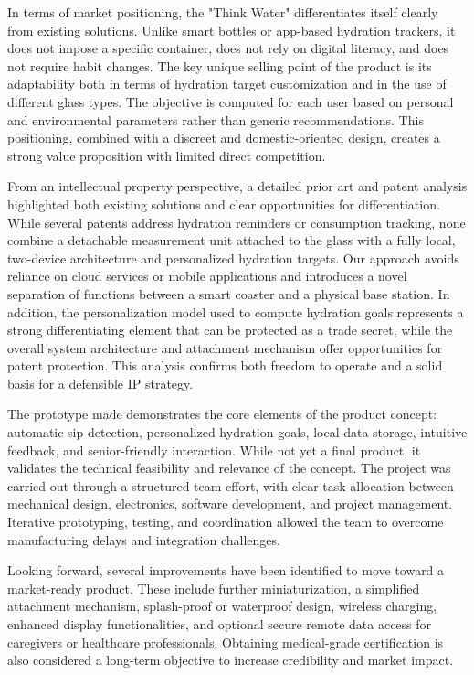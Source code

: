 \documentclass{article}
\begin{document}
In terms of market positioning, the "Think Water" differentiates itself clearly from existing solutions. Unlike smart bottles or app-based hydration trackers, it does not impose a specific container, does not rely on digital literacy, and does not require habit changes. The key unique selling point of the product is its adaptability both in terms of hydration target customization and in the use of different glass types. The objective is computed for each user based on personal and environmental parameters rather than generic recommendations. This positioning, combined with a discreet and domestic-oriented design, creates a strong value proposition with limited direct competition.\vspace{0.2cm}

From an intellectual property perspective, a detailed prior art and patent analysis highlighted both existing solutions and clear opportunities for differentiation. While several patents address hydration reminders or consumption tracking, none combine a detachable measurement unit attached to the glass with a fully local, two-device architecture and personalized hydration targets. Our approach avoids reliance on cloud services or mobile applications and introduces a novel separation of functions between a smart coaster and a physical base station. In addition, the personalization model used to compute hydration goals represents a strong differentiating element that can be protected as a trade secret, while the overall system architecture and attachment mechanism offer opportunities for patent protection. This analysis confirms both freedom to operate and a solid basis for a defensible IP strategy.\vspace{0.2cm}



The prototype made demonstrates the core elements of the product concept: automatic sip detection, personalized hydration goals, local data storage, intuitive feedback, and senior-friendly interaction. While not yet a final product, it validates the technical feasibility and relevance of the concept. The project was carried out through a structured team effort, with clear task allocation between mechanical design, electronics, software development, and project management. Iterative prototyping, testing, and coordination allowed the team to overcome manufacturing delays and integration challenges.\vspace{0.2cm}

Looking forward, several improvements have been identified to move toward a market-ready product. These include further miniaturization, a simplified attachment mechanism, splash-proof or waterproof design, wireless charging, enhanced display functionalities, and optional secure remote data access for caregivers or healthcare professionals. Obtaining medical-grade certification is also considered a long-term objective to increase credibility and market impact.\vspace{0.2cm}
\end{document}
